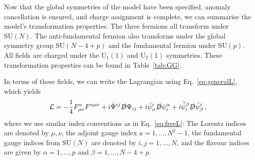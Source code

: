 Now that the global symmetries of the model have been specified, anomaly cancellation is ensured, and charge assignment is complete, we can summarise the model's transformation properties: The three fermions all transform under $\mathrm{SU}(N)$. The anti-fundamental fermion also transforms under the global symmetry group $\mathrm{SU}(N-4+p)$ and the fundamental fermion under $\mathrm{SU}(p)$. All fields are charged under the $\mathrm{U}_1(1)$ and $\mathrm{U}_2(1)$ symmetries. These transformation properties can be found in Table~\ref{tab:GG}.

In terms of these fields, we can write the Lagrangian using Eq.~\eqref{eq:generalL}, which yields
\begin{equation}
    \mathcal{L}= -\frac{1}{4} F_{\mu\nu}^a F^{a\mu\nu}+ i \bar{\Psi}^{ij} \slashed{D} \Psi_{ij} 
    + i \bar{\psi}^i_\alpha \slashed{D} \psi_i^\alpha 
    + i \bar{\tilde{\psi}}_i^\beta \slashed{D} \tilde{\psi}^i_\beta\,,\label{eq:lGGnoscalar}
\end{equation}
where we use similar index conventions as in Eq.~\eqref{eq:freeL}: The Lorentz indices are denoted by $\mu,\nu$, the adjoint gauge index $a=1,\dots,N^2-1$, the fundamental gauge indices from $\mathrm{SU}(N)$ are denoted by $i,j=1,\dots,N$, and the flavour indices are given by $\alpha=1,\dots, p$ and $\beta=1,\dots,N-4+p$. 


